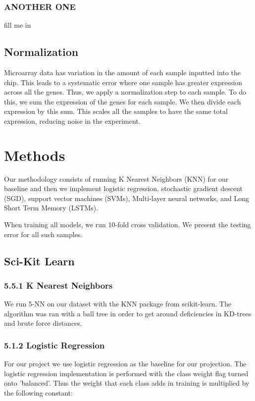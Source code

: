 \documentclass[12pt]{scrartcl}
\begin{document}
    \subsubsection{ANOTHER ONE}
    fill me in
    \subsection{Normalization}
Microarray data has variation in the amount of each sample inputted into the chip. This leads to a systematic error where one sample has greater expression across all the genes. Thus, we apply a normalization step to each sample. To do this, we sum the expression of the genes for each sample. We then divide each expression by this sum. This scales all the samples to have the same total expression, reducing  noise in the experiment.
    \section{Methods}
	Our methodology consists of running K Nearest Neighbors (KNN) for our baseline and then we implement logistic regression, stochastic gradient descent (SGD), support vector machines (SVMs), Multi-layer neural networks, and Long Short Term Memory (LSTMs).
    
    When training all models, we run 10-fold cross validation. We present the testing error for all such samples. 

	\subsection{Sci-Kit Learn}
    \subsubsection*{5.5.1 K Nearest Neighbors}
    We run 5-NN on our dataset with the KNN package from scikit-learn. The algorithm was ran with a ball tree in order to get around deficiencies in KD-trees and brute force distances. 
    
	\subsubsection*{5.1.2 Logistic Regression}
    For our project we use logistic regression as the baseline for our projection. The logistic regression implementation is performed with the class weight flag turned onto 'balanced'. Thus the weight that each class adds in training is multiplied by the following constant:
    
\end{document}
